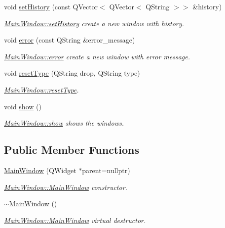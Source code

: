 \begin{DoxyCompactItemize}
void \hyperlink{class_main_window_ace7360a427c4d1b9a5252bd7a468510d}{set\+History} (const Q\+Vector$<$ Q\+Vector$<$ Q\+String $>$$>$ \&history)
\begin{DoxyCompactList}\small\item\em \hyperlink{class_main_window_ace7360a427c4d1b9a5252bd7a468510d}{Main\+Window\+::set\+History} create a new window with history. \end{DoxyCompactList}\item 
void \hyperlink{class_main_window_a8f2494aee2da70c23aff1c016c6b3225}{error} (const Q\+String \&error\+\_\+message)
\begin{DoxyCompactList}\small\item\em \hyperlink{class_main_window_a8f2494aee2da70c23aff1c016c6b3225}{Main\+Window\+::error} create a new window with error message. \end{DoxyCompactList}\item 
void \hyperlink{class_main_window_ae01409cebd6dcebf97ca2f4696fcf542}{reset\+Type} (Q\+String drop, Q\+String type)
\begin{DoxyCompactList}\small\item\em \hyperlink{class_main_window_ae01409cebd6dcebf97ca2f4696fcf542}{Main\+Window\+::reset\+Type}. \end{DoxyCompactList}\item 
\mbox{\label{class_main_window_ae3d7a4598609a86e8bd317c0d85c4495}} 
void \hyperlink{class_main_window_ae3d7a4598609a86e8bd317c0d85c4495}{show} ()
\begin{DoxyCompactList}\small\item\em \hyperlink{class_main_window_ae3d7a4598609a86e8bd317c0d85c4495}{Main\+Window\+::show} shows the windows. \end{DoxyCompactList}\end{DoxyCompactItemize}
\subsection*{Public Member Functions}
\begin{DoxyCompactItemize}
\item 
\hyperlink{class_main_window_a996c5a2b6f77944776856f08ec30858d}{Main\+Window} (Q\+Widget $\ast$parent=nullptr)
\begin{DoxyCompactList}\small\item\em \hyperlink{class_main_window_a996c5a2b6f77944776856f08ec30858d}{Main\+Window\+::\+Main\+Window} constructor. \end{DoxyCompactList}\item 
\mbox{\label{class_main_window_ae98d00a93bc118200eeef9f9bba1dba7}} 
\hyperlink{class_main_window_ae98d00a93bc118200eeef9f9bba1dba7}{$\sim$\+Main\+Window} ()
\begin{DoxyCompactList}\small\item\em \hyperlink{class_main_window_a996c5a2b6f77944776856f08ec30858d}{Main\+Window\+::\+Main\+Window} virtual destructor. \end{DoxyCompactList}\end{DoxyCompactItemize}
